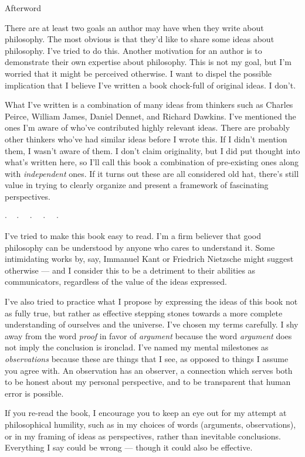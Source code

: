 \documentclass[9pt, twoside]{book}
\theoremstyle{argtstyle}
\newcommand{\dotq}{\cdot\quad}
\newcommand{\scenebreak}{
    \medskip\centerline{$\dotq\dotq\dotq\dotq\cdot$}\medskip
}
\begin{document}
\vfill

\pagebreak

{\huge Afterword}
\bigskip

There are at least two goals an author may have when they write about
philosophy.
The most obvious is that they'd like to share some ideas about philosophy.
I've tried to do this.
Another motivation for an author is to demonstrate their own expertise about
philosophy.
This is not my goal, but I'm worried that it might be perceived otherwise.
I want to dispel the possible implication that I believe I've written a
book chock-full of original ideas. I don't.

What I've written is a combination of many ideas from thinkers such as Charles
Peirce, William James, Daniel Dennet, and Richard Dawkins.
I've mentioned the ones I'm aware of who've contributed highly relevant ideas.
There are probably other thinkers who've had similar ideas before I wrote
this. If I didn't mention them, I wasn't aware of them.
I don't claim
originality, but I did put thought into what's written here, so I'll call this
book a combination of pre-existing ones along with {\em independent} ones.
If it turns out these are all considered old hat, there's still value in
trying to clearly organize and present a framework of fascinating perspectives.

\scenebreak

I've tried to make this book easy to read.
I'm a firm believer that
good philosophy can be understood by anyone who cares to understand it.
Some intimidating works by, say, Immanuel Kant or Friedrich Nietzsche might
suggest otherwise ---
and I consider this to be a detriment to their abilities as
communicators, regardless of the value of the ideas expressed.

I've also tried to practice what I propose by expressing the ideas of this
book not as fully true,
but rather as effective stepping stones towards
a more complete understanding of ourselves and the universe. I've chosen my
terms carefully. I shy away from the word {\em proof} in favor of {\em argument}
because the word {\em argument} does not imply the conclusion is ironclad.
I've named my mental milestones as {\em observations} because these are things
that I see, as opposed to things I assume you agree with.
An observation has an observer,
a connection which serves both to be honest about my personal perspective,
and to be transparent that human error is possible.

If you re-read the book, I encourage you to keep an eye out for my attempt at
philosophical humility, such as in my choices of words (arguments,
observations), or in my framing of ideas as perspectives, rather than inevitable
conclusions.
Everything I say could be wrong --- though it could also be effective.
\end{document}
